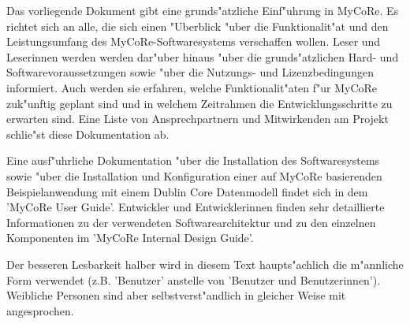 Das vorliegende Dokument gibt eine grunds"atzliche Einf"uhrung in MyCoRe. 
Es richtet sich an alle, die sich einen "Uberblick "uber die Funktionalit"at und den
Leistungsumfang des MyCoRe-Softwaresystems verschaffen wollen.
Leser und Leserinnen werden werden dar"uber hinaus "uber die 
grunds"atzlichen Hard- und Softwarevoraussetzungen sowie "uber die
Nutzungs- und Lizenzbedingungen informiert. 
Auch werden sie erfahren, welche Funktionalit"aten f"ur MyCoRe zuk"unftig
geplant sind und in welchem Zeitrahmen die Entwicklungsschritte zu erwarten sind.
Eine Liste von Ansprechpartnern und Mitwirkenden am Projekt schlie"st diese
Dokumentation ab.

Eine ausf"uhrliche Dokumentation "uber die Installation des Softwaresystems sowie 
"uber die Installation und Konfiguration einer auf MyCoRe basierenden
Beispielanwendung mit einem Dublin Core Datenmodell findet sich in dem
'MyCoRe User Guide'.
Entwickler und Entwicklerinnen finden sehr detaillierte Informationen
zu der verwendeten Softwarearchitektur und zu den einzelnen Komponenten
im 'MyCoRe Internal Design Guide'.

Der besseren Lesbarkeit halber wird in diesem Text haupts"achlich die m"annliche 
Form verwendet (z.B. 'Benutzer' anstelle von 'Benutzer und Benutzerinnen'). 
Weibliche Personen sind aber selbstverst"andlich in gleicher Weise mit angesprochen.
 